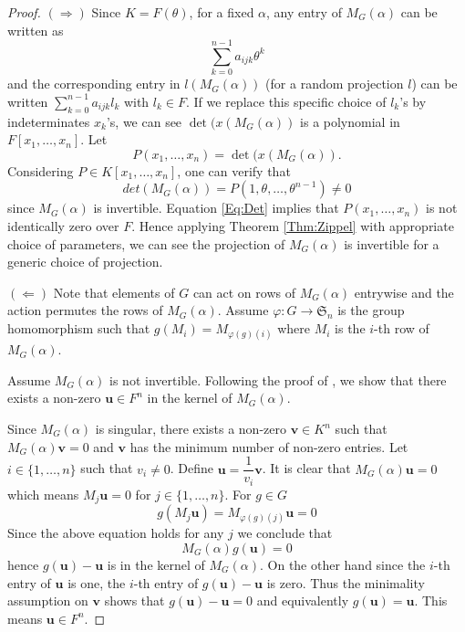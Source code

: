 \documentclass[sigconf]{acmart}
\theoremstyle{acmplain}
\begin{document}
\begin{proof}
$(\Rightarrow)$ Since $K = F(\theta)$, for a fixed $\alpha$, any entry of $M_G(\alpha)$ can be written as 
\begin{equation}\label{Eq:PrimElm}
\sum_{k= 0}^{n-1} a_{ijk}\theta^k
\end{equation}
 and the corresponding entry in $l(M_G(\alpha))$ (for a random projection $l$)
 can be written $\sum_{k= 0}^{n-1} a_{ijk}l_k$ with $l_k\in F$. If we replace this specific choice of $l_k$'s by 
 indeterminates $x_k$'s, we can see $\det(x(M_G(\alpha))$ is a polynomial in $F[x_1, \ldots, x_n].$ Let 
 $$P(x_1, \ldots, x_n) = \det(x(M_G(\alpha)).$$ 
 Considering $P \in K[x_1, \ldots , x_n]$, one can verify that 
 \begin{equation}\label{Eq:Det}
 det(M_G(\alpha))= P(1, \theta, \ldots, \theta^{n-1}) \neq 0
 \end{equation}
 since $M_G(\alpha)$ is invertible. Equation \ref{Eq:Det} implies that $P(x_1, \ldots, x_n)$ is not identically zero over $F$. Hence applying Theorem \ref{Thm:Zippel} with appropriate choice of parameters, we can see 
 the projection of $M_G(\alpha)$ is invertible for a generic choice of projection. 
 
 $(\Leftarrow)$  Note that elements of $G$ can act on 
 rows of $M_G(\alpha)$ entrywise and the action permutes the rows of $M_G(\alpha)$. Assume $\varphi : G \longrightarrow \mathfrak{S}_n$ is the group homomorphism 
 such that $g(M_i) = M_{\varphi(g)(i)}$ where $M_i$ is the $i$-th row of $M_G(\alpha)$.
 
 Assume $M_G(\alpha)$ is not invertible. Following the proof of \cite[Lemma 4]{Armin}, we show that there exists a non-zero $\textbf{u} \in F^n$ in the kernel of $M_G(\alpha)$. 
 
 Since $M_G(\alpha)$ is singular, there exists a non-zero $\textbf{v} \in K^n$  such that $M_G(\alpha)\textbf{v} = 0$ and $\textbf{v}$ has the minimum number of non-zero entries. Let $i \in  \lbrace 1, \ldots , n \rbrace$ such that $v_i \neq 0$. Define $\textbf{u} = \dfrac{1}{v_i}\textbf{v}$. It is clear  that $M_G(\alpha)\textbf{u} = 0$ which means $M_j \textbf{u} = 0 $ for $j \in \lbrace 1, \ldots, n \rbrace$. For $g \in G$
 \begin{equation}
  g(M_j \textbf{u}) = M_{\varphi(g)(j)} \textbf{u}= 0
 \end{equation}
 Since the above equation holds for any $j$ we conclude that $$M_G(\alpha)g(\textbf{u})= 0$$ hence
 $g(\textbf{u})-\textbf{u}$ is in the kernel of $M_G(\alpha)$. On the other hand since the $i$-th entry 
 of $\textbf{u}$ is one, the $i$-th entry of $g(\textbf{u}) -\textbf{u}$ is zero. Thus the minimality assumption
 on $\textbf{v}$ shows that $g(\textbf{u}) -\textbf{u} = 0$ and equivalently $g(\textbf{u})=\textbf{u}$. This 
 means $\textbf{u} \in F^n$.
 

\end{proof}
\end{document}
